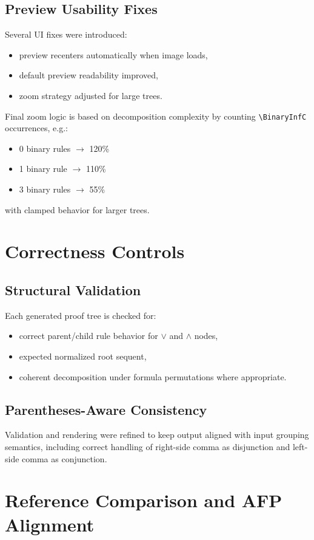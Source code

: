 \documentclass[11pt,a4paper]{article}
\begin{document}
\subsection{Preview Usability Fixes}
Several UI fixes were introduced:
\begin{itemize}[leftmargin=1.5em]
  \item preview recenters automatically when image loads,
  \item default preview readability improved,
  \item zoom strategy adjusted for large trees.
\end{itemize}

Final zoom logic is based on decomposition complexity by counting \texttt{\textbackslash BinaryInfC} occurrences, e.g.:
\begin{itemize}[leftmargin=1.5em]
  \item 0 binary rules $\rightarrow$ 120\%
  \item 1 binary rule $\rightarrow$ 110\%
  \item 3 binary rules $\rightarrow$ 55\%
\end{itemize}
with clamped behavior for larger trees.

\section{Correctness Controls}
\subsection{Structural Validation}
Each generated proof tree is checked for:
\begin{itemize}[leftmargin=1.5em]
  \item correct parent/child rule behavior for $\vee$ and $\wedge$ nodes,
  \item expected normalized root sequent,
  \item coherent decomposition under formula permutations where appropriate.
\end{itemize}

\subsection{Parentheses-Aware Consistency}
Validation and rendering were refined to keep output aligned with input grouping semantics, including correct handling of right-side comma as disjunction and left-side comma as conjunction.

\section{Reference Comparison and AFP Alignment}
\end{document}
